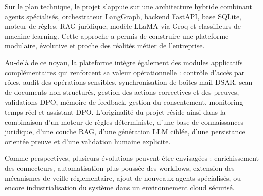 \documentclass[12pt,a4paper]{report}
\begin{document}
Sur le plan technique, le projet s'appuie sur une architecture hybride combinant agents spécialisés, orchestrateur LangGraph, backend FastAPI, base SQLite, moteur de règles, RAG juridique, modèle LLaMA via Groq et classifieurs de machine learning. Cette approche a permis de construire une plateforme modulaire, évolutive et proche des réalités métier de l'entreprise.

Au-delà de ce noyau, la plateforme intègre également des modules applicatifs complémentaires qui renforcent sa valeur opérationnelle : contrôle d'accès par rôles, audit des opérations sensibles, synchronisation de boîtes mail DSAR, scan de documents non structurés, gestion des actions correctives et des preuves, validations DPO, mémoire de feedback, gestion du consentement, monitoring temps réel et assistant DPO. L'originalité du projet réside ainsi dans la combinaison d'un moteur de règles déterministe, d'une base de connaissances juridique, d'une couche RAG, d'une génération LLM ciblée, d'une persistance orientée preuve et d'une validation humaine explicite.

Comme perspectives, plusieurs évolutions peuvent être envisagées : enrichissement des connecteurs, automatisation plus poussée des workflows, extension des mécanismes de veille réglementaire, ajout de nouveaux agents spécialisés, ou encore industrialisation du système dans un environnement cloud sécurisé.
\end{document}
